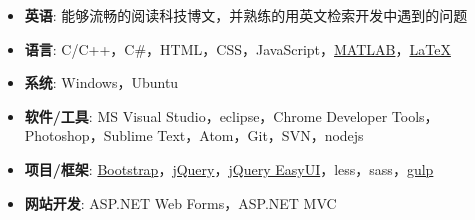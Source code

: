 \documentclass[letterpaper,11pt]{article}
\begin{document}
  \begin{itemize}[leftmargin=*]
    \item \textbf{英语}: 能够流畅的阅读科技博文，并熟练的用英文检索开发中遇到的问题
    \item \textbf{语言}: C/C++，C\#，HTML，CSS，JavaScript，\href{http://cn.mathworks.com/products/matlab/}{MATLAB}，\href{http://www.latex-project.org/}{\LaTeX}
    \item \textbf{系统}: Windows，Ubuntu
    \item \textbf{软件/工具}: MS Visual Studio，eclipse，Chrome Developer Tools，Photoshop，Sublime Text，Atom，Git，SVN，nodejs
    \item \textbf{项目/框架}: \href{http://www.bootcss.com/}{Bootstrap}，\href{https://jquery.com/}{jQuery}，\href{http://jeasyui.com/}{jQuery EasyUI}，less，sass，\href{http://gulpjs.com/}{gulp}
    \item \textbf{网站开发}: ASP.NET Web Forms，ASP.NET MVC
  \end{itemize}

\end{document}
